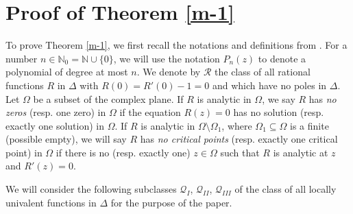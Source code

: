 \documentclass[10pt]{amsart}
\theoremstyle{definition}    %
\numberwithin{equation}{section}
\begin{document}
\section{\bf {Proof of Theorem \ref{m-1}}}
To prove Theorem \ref{m-1}, we first  recall the notations and definitions from \cite{Jin-c}.  For a number $n\in \mathbb{N}_0=\mathbb{N}\cup \{0\}$, we will use the notation $P_n(z)$ to denote a polynomial of degree at most $n$. We denote by $\mathcal{R}$ the class of all rational functions $R$ in $\Delta$ with $R(0)=R'(0)-1=0$ and which have no poles in $\Delta$. Let $\Omega$ be a subset of the complex plane. If $R$ is analytic in $\Omega$, we say $R$ has {\em no zeros} (resp. one zero) in $\Omega$ if the equation $R(z)=0$ has no solution (resp. exactly one solution) in $\Omega$. If $R$ is analytic in $\Omega \setminus \Omega_1$, where $\Omega_1\subseteq \Omega$ is a finite (possible empty), we will say $R$ has {\em no critical points} (resp. exactly one critical point) in $\Omega$ if there is no (resp. exactly one) $z\in \Omega$ such that $R$ is analytic at $z$ and $R'(z)=0$.

We will consider the following subclasses $\mathcal{Q}_{I}$, $\mathcal{Q}_{II}$, $\mathcal{Q}_{III}$ of the class of all locally univalent functions in $\Delta$ for the purpose of the paper. 
\end{document}
